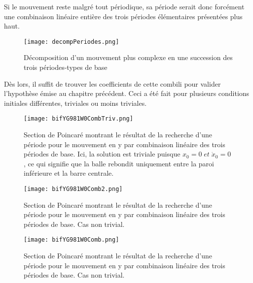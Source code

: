 \documentclass[a4paper]{report}
\begin{document}
Si le mouvement reste malgré tout périodique, sa période serait donc forcément une combinaison linéaire entière des trois périodes élémentaires présentées plus haut.
\begin{figure}[H]
   \texttt{[image: decompPeriodes.png]}
      \caption[Décomposition d'un mouvement plus complexe en une succession des trois périodes-types de base]{Décomposition d'un mouvement plus complexe en une succession des trois périodes-types de base}
\end{figure}
Dès lors, il suffit de trouver les coefficients de cette combili pour valider l'hypothèse émise au chapitre précédent. Ceci a été fait pour plusieurs conditions initiales différentes, triviales ou moins triviales.
\begin{figure}[H]
   \texttt{[image: bifYG981W0CombTriv.png]}
      \caption[Cas trivial d'une recherche d'une période pour le mouvement en y: g=9.81 ]{Section de Poincaré montrant le résultat de la recherche d'une période pour le mouvement en y par combinaison linéaire des trois périodes de base. Ici, la solution est triviale puisque \(x_0=0 \; et \; \dot{x}_0=0\), ce qui signifie que la balle rebondit uniquement entre la paroi inférieure et la barre centrale.}
\end{figure}
\begin{figure}[H]
   \texttt{[image: bifYG981W0Comb2.png]}
      \caption[Recherche d'une période pour le mouvement en y: g=9.81 .]{Section de Poincaré montrant le résultat de la recherche d'une période pour le mouvement en y par combinaison linéaire des trois périodes de base. Cas non trivial.}
\end{figure}
\begin{figure}[H]
   \texttt{[image: bifYG981W0Comb.png]}
      \caption[Recherche d'une période pour le mouvement en y: g=9.81 .]{Section de Poincaré montrant le résultat de la recherche d'une période pour le mouvement en y par combinaison linéaire des trois périodes de base. Cas non trivial. \label{fig:poincNonTrivial}}
\end{figure}
\end{document}
